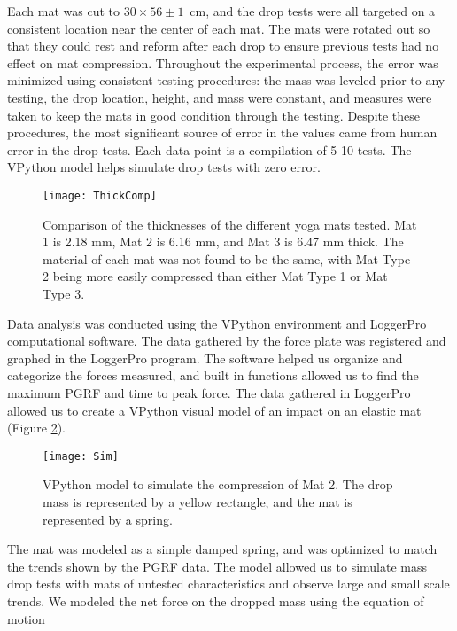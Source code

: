 \documentclass[12pt,aps,prb,preprint]{revtex4-1}   %
\begin{document}
Each mat was cut to $30 \times 56 \pm 1$~cm, and the drop tests were all targeted on a consistent location near the center of each mat. The mats were rotated out so that they could rest and reform after each drop to ensure previous tests had no effect on mat compression. Throughout the experimental process, the error was minimized using consistent testing procedures: the mass was leveled prior to any testing, the drop location, height, and mass were constant, and measures were taken to keep the mats in good condition through the testing. Despite these procedures, the most significant source of error in the values came from human error in the drop tests. Each data point is a compilation of 5-10 tests. The VPython model helps simulate drop tests with zero error.

\vspace{-0.5 mm}
\begin{figure}[h]
	\centering
	\texttt{[image: ThickComp]}
	\caption{Comparison of the thicknesses of the different yoga mats tested. Mat 1 is 2.18 mm, Mat 2 is 6.16 mm, and Mat 3 is 6.47 mm thick. The material of each mat was not found to be the same, with Mat Type 2 being more easily compressed than either Mat Type 1 or Mat Type 3.}
	\label{fig:matcomp}
\end{figure}

\vspace{-2 mm}
Data analysis was conducted using the VPython environment and LoggerPro computational software. The data gathered by the force plate was registered and graphed in the LoggerPro program. The software helped us organize and categorize the forces measured, and built in functions allowed us to find the maximum PGRF and time to peak force. The data gathered in LoggerPro allowed us to create a VPython visual model of an impact on an elastic mat (Figure \ref{fig:sim}).

\begin{figure}[h]
	\centering
	\texttt{[image: Sim]}
	\caption{VPython model to simulate the compression of Mat 2. The drop mass is represented by a yellow rectangle, and the mat is represented by a spring.}
	\label{fig:sim}
\end{figure}

The mat was modeled as a simple damped spring, and was optimized to match the trends shown by the PGRF data. The model allowed us to simulate mass drop tests with mats of untested characteristics and observe large and small scale trends.
We modeled the net force on the dropped mass using the equation of motion
\end{document}
